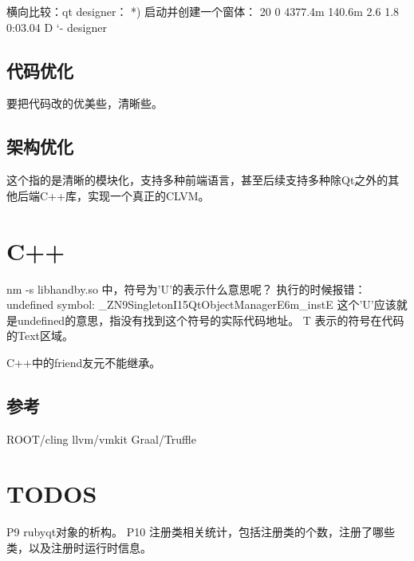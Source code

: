 横向比较：qt designer：
*) 启动并创建一个窗体： 20   0 4377.4m 140.6m   2.6  1.8   0:03.04 D    `- designer

\section{代码优化}
要把代码改的优美些，清晰些。

\section{架构优化}
这个指的是清晰的模块化，支持多种前端语言，甚至后续支持多种除Qt之外的其他后端C++库，实现一个真正的CLVM。


\chapter{C++}
nm -s libhandby.so 中，符号为'U'的表示什么意思呢？
执行的时候报错：undefined symbol: \_ZN9SingletonI15QtObjectManagerE6m\_instE
这个'U'应该就是undefined的意思，指没有找到这个符号的实际代码地址。
T 表示的符号在代码的Text区域。

C++中的friend友元不能继承。

\section{参考}
ROOT/cling
llvm/vmkit
Graal/Truffle

\chapter{TODOS}
P9  rubyqt对象的析构。
P10 注册类相关统计，包括注册类的个数，注册了哪些类，以及注册时运行时信息。

